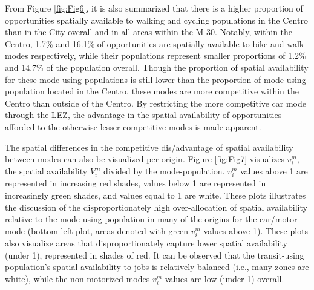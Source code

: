 \documentclass[10pt,letterpaper]{article}
\begin{document}
From Figure \ref{fig:Fig6}, it is also summarized that there is a higher
proportion of opportunities spatially available to walking and cycling
populations in the Centro than in the City overall and in all areas
within the M-30. Notably, within the Centro, 1.7\% and 16.1\% of
opportunities are spatially available to bike and walk modes
respectively, while their populations represent smaller proportions of
1.2\% and 14.7\% of the population overall. Though the proportion of
spatial availability for these mode-using populations is still lower
than the proportion of mode-using population located in the Centro,
these modes are more competitive within the Centro than outside of the
Centro. By restricting the more competitive car mode through the LEZ,
the advantage in the spatial availability of opportunities afforded to
the otherwise lesser competitive modes is made apparent.

The spatial differences in the competitive dis/advantage of spatial
availability between modes can also be visualized per origin. Figure
\ref{fig:Fig7} visualizes \(v_i^m\), the spatial availability \(V_i^m\)
divided by the mode-population. \(v_i^m\) values above 1 are represented
in increasing red shades, values below 1 are represented in increasingly
green shades, and values equal to 1 are white. These plots illustrates
the discussion of the disproportionately high over-allocation of spatial
availability relative to the mode-using population in many of the
origins for the car/motor mode (bottom left plot, areas denoted with
green \(v_i^m\) values above 1). These plots also visualize areas that
disproportionately capture lower spatial availability (under 1),
represented in shades of red. It can be observed that the transit-using
population's spatial availability to jobs is relatively balanced (i.e.,
many zones are white), while the non-motorized modes \(v_i^m\) values
are low (under 1) overall.
\end{document}
